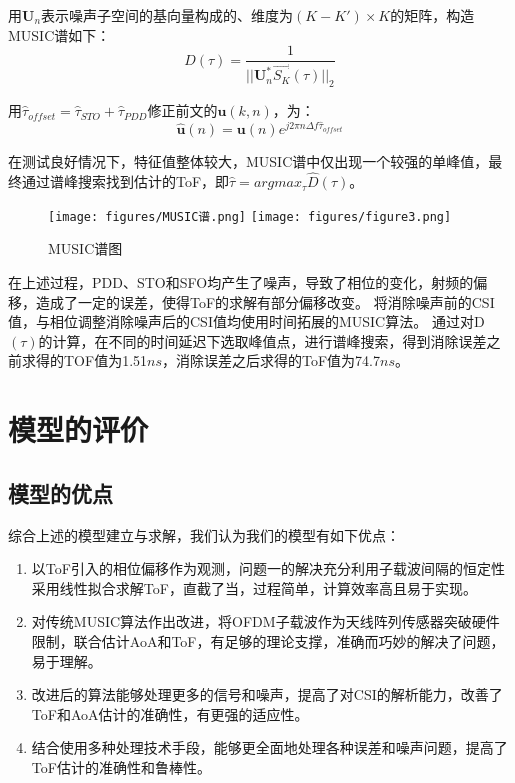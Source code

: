 \documentclass[withoutpreface,bwprint]{cumcmthesis}
\begin{document}
用$\textbf{U}_n$表示噪声子空间的基向量构成的、维度为$(K-K')\times K$的矩阵，构造MUSIC谱如下：
\begin{equation}
    D(\tau)=\frac{1}{||\textbf{U}_n^*\vec{S_K}(\tau)||_2}
\end{equation}

用$\widehat{\tau}_{offset}=\widehat{\tau}_{STO}+\widehat{\tau}_{PDD}$修正前文的$\textbf{u}(k,n)$，为：
\begin{equation}
    \widehat{\textbf{u}}(n)=\textbf{u}(n)e^{j2\pi n\Delta f\widehat{\tau}_{offset}}
\end{equation}

在测试良好情况下，特征值整体较大，MUSIC谱中仅出现一个较强的单峰值，最终通过谱峰搜索找到估计的ToF，即$\widehat{\tau}=argmax_{\tau}\widehat{D}(\tau)$。

\begin{figure}
\centering
\subcaptionbox{}
{\texttt{[image: figures/MUSIC谱.png]}}
\subcaptionbox{}
{\texttt{[image: figures/figure3.png]}}
\caption{MUSIC谱图}\label{fig:双图}
\end{figure} 

在上述过程，PDD、STO和SFO均产生了噪声，导致了相位的变化，射频的偏移，造成了一定的误差，使得ToF的求解有部分偏移改变。
将消除噪声前的CSI值，与相位调整消除噪声后的CSI值均使用时间拓展的MUSIC算法。
通过对{D}$(\tau)$的计算，在不同的时间延迟下选取峰值点，进行谱峰搜索，得到消除误差之前求得的TOF值为1.51$ns$，消除误差之后求得的ToF值为74.7$ns$。


\section{模型的评价}

\subsection{模型的优点}
综合上述的模型建立与求解，我们认为我们的模型有如下优点：

\begin{enumerate}
    \item 以ToF引入的相位偏移作为观测，问题一的解决充分利用子载波间隔的恒定性采用线性拟合求解ToF，直截了当，过程简单，计算效率高且易于实现。
    \item 对传统MUSIC算法作出改进，将OFDM子载波作为天线阵列传感器突破硬件限制，联合估计AoA和ToF，有足够的理论支撑，准确而巧妙的解决了问题，易于理解。
    \item 改进后的算法能够处理更多的信号和噪声，提高了对CSI的解析能力，改善了ToF和AoA估计的准确性，有更强的适应性。
    \item 结合使用多种处理技术手段，能够更全面地处理各种误差和噪声问题，提高了ToF估计的准确性和鲁棒性。
\end{enumerate}
\end{document}
